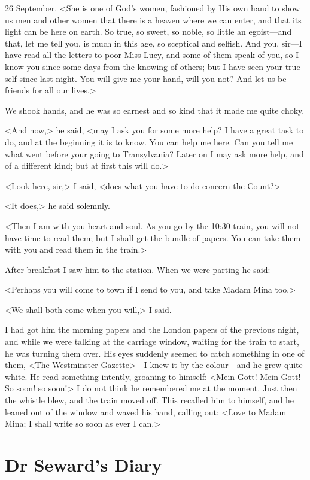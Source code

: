 \begin{diary}{26 September.}
<She is one of God's women, fashioned by His own hand to show us men and other women that there is a heaven where we can enter, and that its light can be here on earth. So true, so sweet, so noble, so little an egoist—and that, let me tell you, is much in this age, so sceptical and selfish. And you, sir—I have read all the letters to poor Miss Lucy, and some of them speak of you, so I know you since some days from the knowing of others; but I have seen your true self since last night. You will give me your hand, will you not? And let us be friends for all our lives.>

We shook hands, and he was so earnest and so kind that it made me quite choky.

<And now,> he said, <may I ask you for some more help? I have a great task to do, and at the beginning it is to know. You can help me here. Can you tell me what went before your going to Transylvania? Later on I may ask more help, and of a different kind; but at first this will do.>

<Look here, sir,> I said, <does what you have to do concern the Count?>

<It does,> he said solemnly.

<Then I am with you heart and soul. As you go by the 10:30 train, you will not have time to read them; but I shall get the bundle of papers. You can take them with you and read them in the train.>

After breakfast I saw him to the station. When we were parting he said:—

<Perhaps you will come to town if I send to you, and take Madam Mina too.>

<We shall both come when you will,> I said.

I had got him the morning papers and the London papers of the previous night, and while we were talking at the carriage window, waiting for the train to start, he was turning them over. His eyes suddenly seemed to catch something in one of them, <The Westminster Gazette>—I knew it by the colour—and he grew quite white. He read something intently, groaning to himself: <Mein Gott! Mein Gott! So soon! so soon!> I do not think he remembered me at the moment. Just then the whistle blew, and the train moved off. This recalled him to himself, and he leaned out of the window and waved his hand, calling out: <Love to Madam Mina; I shall write so soon as ever I can.>
\end{diary}

\section{Dr Seward's Diary}

